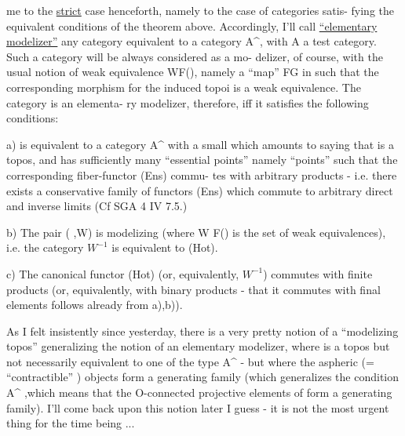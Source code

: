 me to the \uline{strict} case henceforth,  namely to the case of categories satis-%
fying the equivalent conditions of the theorem above. Accordingly, I'll
call \uline{``elementary modelizer''} any category  equivalent to a category A\^{},
with A a test category.  Such a category will be always considered as a mo-%
delizer, of course,  with the usual notion of weak equivalence W\hand{$\subset$}F\hand{$\ell$}(),
namely a ``map''  F\hand{$\to$}G in  such that the corresponding morphism for the
induced topoi is a weak equivalence.  The  category  is an elementa-%
ry modelizer,  therefore,  iff it satisfies the following conditions:

a)  is equivalent to a category A\^{} with a small  which amounts to
saying that  is a topos,  and has sufficiently many ``essential points''
namely ``points'' such that the corresponding fiber-functor  (Ens) commu-%
tes with arbitrary products  -  i.e. there exists a conservative family
of functors   (Ens)  which commute to arbitrary direct and inverse
limits (Cf SGA 4 IV 7.5.)

b)  The pair ( ,W) is modelizing (where W \hand{$\subset$} F\hand{$\ell$}() is the set of weak
equivalences),  i.e. the category  $W^{-1}$  is equivalent to (Hot).

c)  The canonical functor  (Hot)  (or, equivalently,  $W^{-1}$)
commutes with finite products (or, equivalently,  with binary products -
that it commutes with final elements follows already from a),b)).

As I felt insistently since yesterday,  there is a very pretty notion
of a ``modelizing topos'' generalizing the notion of an elementary modelizer,
where  is a topos but not necessarily equivalent to one of the type A\^{}
-  but  where  the aspheric (= ``contractible'' ) objects form a
generating family (which generalizes the condition A\^{} ,which means
\margin{$\uparrow$}that the O-connected projective elements of  form a generating family).
I'll come back upon this notion later I guess -  it is not the most urgent
thing for the time being ...

